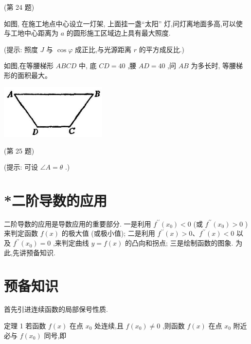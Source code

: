 \documentclass[lang=cn,newtx,10pt,scheme=chinese]{elegantbook}
\begin{document}
\begin{problemset}[习 题 十 一]
(第 24 题)

\item 如图, 在施工地点中心设立一灯架, 上面挂一盏“太阳” 灯,问灯离地面多高,可以使与工地中心距离为 \(a\) 的圆形施工区域边上具有最大照度.

(提示: 照度 \(J\) 与 \(\cos \varphi\) 成正比,与光源距离 \(r\) 的平方成反比.)

\item 如图,在等腰梯形 \({ABCD}\) 中, 底 \({CD} = {40}\) ,腰 \({AD} = {40}\) ,问 \({AB}\) 为多长时, 等腰梯形的面积最大。

\begin{center}
\includegraphics[max width=0.4\textwidth]{images/01912c18-5c3f-733d-b775-749ba9897a9d_159_135403.jpg}
\end{center}

(第 25 题)

(提示: 可设 \(\angle A = \theta\) .)

\end{problemset}

\section*{*二阶导数的应用}

二阶导数的应用是导数应用的重要部分. 一是利用 \({f}^{\prime \prime }\left( {x}_{0}\right) < 0\) (或 \({f}^{\prime \prime }\left( {x}_{0}\right) > 0\) ) 来判定函数 \(f\left( x\right)\) 的极大值 (或极小值); 二是利用 \({f}^{\prime \prime }\left( x\right) > 0\text{、}{f}^{\prime \prime }\left( x\right) < 0\) 以及 \({f}^{\prime \prime }\left( {x}_{0}\right) = 0\) ,来判定曲线 \(y = f\left( x\right)\) 的凸向和拐点; 三是绘制函数的图象. 为此,先讲预备知识.

\section{预备知识}

首先引进连续函数的局部保号性质.

定理 1 若函数 \(f\left( x\right)\) 在点 \({x}_{0}\) 处连续,且 \(f\left( {x}_{0}\right) \neq 0\) ,则函数 \(f\left( x\right)\) 在点 \({x}_{0}\) 附近必与 \(f\left( {x}_{0}\right)\) 同号,即
\end{document}
